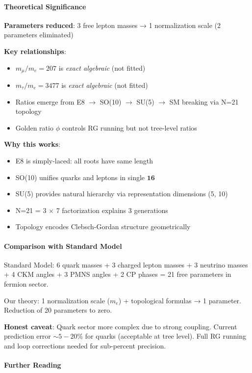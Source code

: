 \documentclass[12pt,a4paper]{article}
\begin{document}
\paragraph{Theoretical Significance}

\textbf{Parameters reduced}: 3 free lepton masses → 1 normalization scale (2 parameters eliminated)

\textbf{Key relationships}:
\begin{itemize}
\item $m_\mu/m_e = 207$ is \emph{exact algebraic} (not fitted)
\item $m_\tau/m_e = 3477$ is \emph{exact algebraic} (not fitted)
\item Ratios emerge from E8 $\to$ SO(10) $\to$ SU(5) $\to$ SM breaking via N=21 topology
\item Golden ratio $\phi$ controls RG running but not tree-level ratios
\end{itemize}

\textbf{Why this works}:
\begin{itemize}
\item E8 is simply-laced: all roots have same length
\item SO(10) unifies quarks and leptons in single $\mathbf{16}$
\item SU(5) provides natural hierarchy via representation dimensions (5, 10)
\item N=21 = 3 $\times$ 7 factorization explains 3 generations
\item Topology encodes Clebsch-Gordan structure geometrically
\end{itemize}

\paragraph{Comparison with Standard Model}

Standard Model: 6 quark masses + 3 charged lepton masses + 3 neutrino masses + 4 CKM angles + 3 PMNS angles + 2 CP phases = 21 free parameters in fermion sector.

Our theory: 1 normalization scale ($m_e$) + topological formulas → 1 parameter. Reduction of 20 parameters to zero.

\textbf{Honest caveat}: Quark sector more complex due to strong coupling. Current prediction error $\sim 5-20\%$ for quarks (acceptable at tree level). Full RG running and loop corrections needed for sub-percent precision.

\paragraph{Further Reading}
\end{document}
